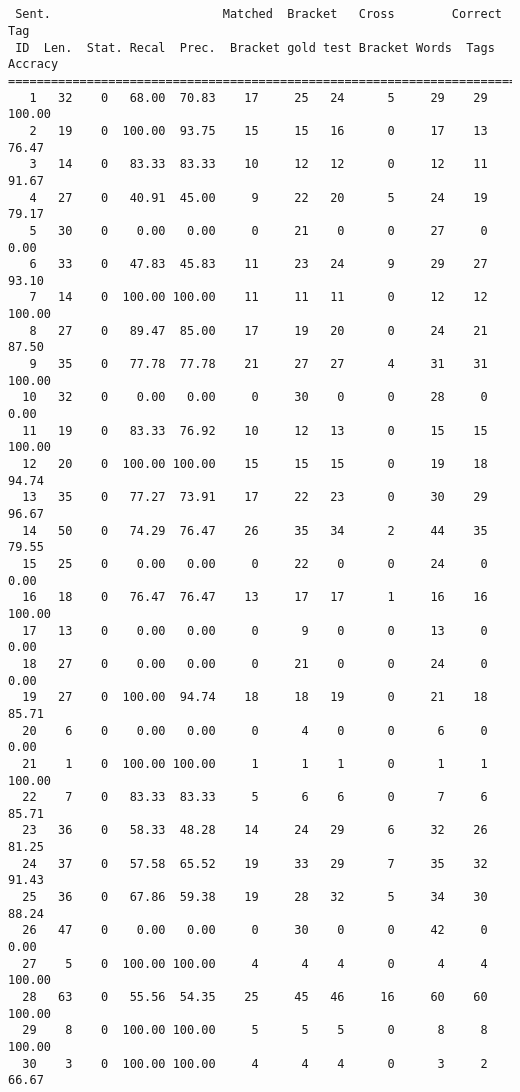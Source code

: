 \begin{verbatim}


 Sent.                        Matched  Bracket   Cross        Correct Tag
 ID  Len.  Stat. Recal  Prec.  Bracket gold test Bracket Words  Tags Accracy
============================================================================
   1   32    0   68.00  70.83    17     25   24      5     29    29   100.00
   2   19    0  100.00  93.75    15     15   16      0     17    13    76.47
   3   14    0   83.33  83.33    10     12   12      0     12    11    91.67
   4   27    0   40.91  45.00     9     22   20      5     24    19    79.17
   5   30    0    0.00   0.00     0     21    0      0     27     0     0.00
   6   33    0   47.83  45.83    11     23   24      9     29    27    93.10
   7   14    0  100.00 100.00    11     11   11      0     12    12   100.00
   8   27    0   89.47  85.00    17     19   20      0     24    21    87.50
   9   35    0   77.78  77.78    21     27   27      4     31    31   100.00
  10   32    0    0.00   0.00     0     30    0      0     28     0     0.00
  11   19    0   83.33  76.92    10     12   13      0     15    15   100.00
  12   20    0  100.00 100.00    15     15   15      0     19    18    94.74
  13   35    0   77.27  73.91    17     22   23      0     30    29    96.67
  14   50    0   74.29  76.47    26     35   34      2     44    35    79.55
  15   25    0    0.00   0.00     0     22    0      0     24     0     0.00
  16   18    0   76.47  76.47    13     17   17      1     16    16   100.00
  17   13    0    0.00   0.00     0      9    0      0     13     0     0.00
  18   27    0    0.00   0.00     0     21    0      0     24     0     0.00
  19   27    0  100.00  94.74    18     18   19      0     21    18    85.71
  20    6    0    0.00   0.00     0      4    0      0      6     0     0.00
  21    1    0  100.00 100.00     1      1    1      0      1     1   100.00
  22    7    0   83.33  83.33     5      6    6      0      7     6    85.71
  23   36    0   58.33  48.28    14     24   29      6     32    26    81.25
  24   37    0   57.58  65.52    19     33   29      7     35    32    91.43
  25   36    0   67.86  59.38    19     28   32      5     34    30    88.24
  26   47    0    0.00   0.00     0     30    0      0     42     0     0.00
  27    5    0  100.00 100.00     4      4    4      0      4     4   100.00
  28   63    0   55.56  54.35    25     45   46     16     60    60   100.00
  29    8    0  100.00 100.00     5      5    5      0      8     8   100.00
  30    3    0  100.00 100.00     4      4    4      0      3     2    66.67

\end{verbatim}
